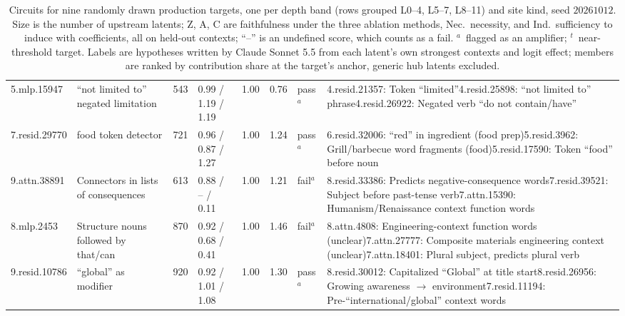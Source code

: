 \documentclass[10pt]{article}
\begin{document}
\begin{table}[h]
\begin{tabularx}{\linewidth}{@{}l>{\raggedright\arraybackslash}p{2.3cm}rllll>{\raggedright\arraybackslash}X@{}}
5.mlp.15947 & ``not limited to'' negated limitation & 543 & 0.99 / 1.19 / 1.19 & 1.00 & 0.76 & pass$^{a}$ & 4.resid.21357: Token ``limited''\newline 4.resid.25898: ``not limited to'' phrase\newline 4.resid.26922: Negated verb ``do not contain/have'' \\
7.resid.29770 & food token detector & 721 & 0.96 / 0.87 / 1.27 & 1.00 & 1.24 & pass$^{a}$ & 6.resid.32006: ``red'' in ingredient (food prep)\newline 5.resid.3962: Grill/barbecue word fragments (food)\newline 5.resid.17590: Token ``food'' before noun \\
\midrule
9.attn.38891 & Connectors in lists of consequences & 613 & 0.88 / -- / 0.11 & 1.00 & 1.21 & fail$^{a}$ & 8.resid.33386: Predicts negative-consequence words\newline 7.resid.39521: Subject before past-tense verb\newline 7.attn.15390: Humanism/Renaissance context function words \\
8.mlp.2453 & Structure nouns followed by that/can & 870 & 0.92 / 0.68 / 0.41 & 1.00 & 1.46 & fail$^{a}$ & 8.attn.4808: Engineering-context function words (unclear)\newline 7.attn.27777: Composite materials engineering context (unclear)\newline 7.attn.18401: Plural subject, predicts plural verb \\
9.resid.10786 & ``global'' as modifier & 920 & 0.92 / 1.01 / 1.08 & 1.00 & 1.30 & pass$^{a}$ & 8.resid.30012: Capitalized ``Global'' at title start\newline 8.resid.26956: Growing awareness $\to$ environment\newline 7.resid.11194: Pre-``international/global'' context words \\
\bottomrule
\end{tabularx}
\caption{Circuits for nine randomly drawn production targets, one per depth band (rows grouped L0--4, L5--7, L8--11) and site kind, seed $20261012$.
Size is the number of upstream latents; Z, A, C are faithfulness under the three ablation methods, Nec.\ necessity, and Ind.\ sufficiency to induce with coefficients, all on held-out contexts; ``--'' is an undefined score, which counts as a fail.
$^{a}$~flagged as an amplifier; $^{t}$~near-threshold target.
Labels are hypotheses written by Claude Sonnet 5.5 from each latent's own strongest contexts and logit effect; members are ranked by contribution share at the target's anchor, generic hub latents excluded.}
\label{tab:random-gallery}
\end{table}
\FloatBarrier
\end{document}
